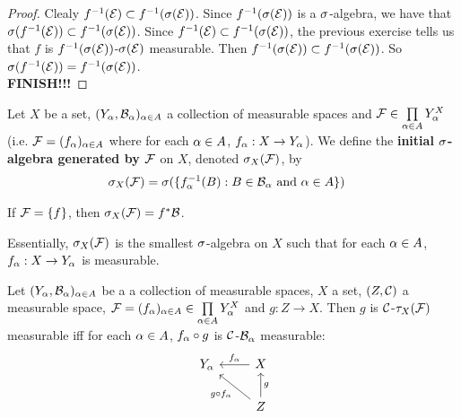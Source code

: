 \documentclass{book}
\begin{document}
	\begin{proof}
		Clealy $f^{-1}(\mathcal{E}) \subset f^{-1}(\sigma(\mathcal{E}))$. Since $f^{-1}(\sigma(\mathcal{E}))$ is a $\sigma$-algebra, we have that $\sigma(f^{-1}(\mathcal{E})) \subset f^{-1}(\sigma(\mathcal{E}))$. Since $f^{-1}(\mathcal{E}) \subset f^{-1}(\sigma(\mathcal{E}))$, the previous exercise tells us that $f$ is $f^{-1}(\sigma(\mathcal{E}))$-$\sigma(\mathcal{E})$ measurable. Then $f^{-1}(\sigma(\mathcal{E})) \subset f^{-1}(\sigma(\mathcal{E}))$. So $\sigma(f^{-1}(\mathcal{E})) = f^{-1}(\sigma(\mathcal{E}))$.  \\
		\textbf{FINISH!!!}
	\end{proof}
	
	\begin{defn} 
		Let $X$ be a set, $(Y_{\alpha}, \mathcal{B}_{\alpha})_{\alpha \in A}$ a collection of measurable spaces and $\mathcal{F} \in \prod \limits_{\alpha \in A}Y_{\alpha}^X$ (i.e. $\mathcal{F} = (f_{\alpha})_{\alpha \in A}$ where for each $\alpha \in A$, $f_{\alpha}:X \rightarrow Y_{\alpha}$). We define the \textbf{initial $\sigma$-algebra generated by $\mathcal{F}$} on $X$, denoted $\sigma_X(\mathcal{F})$, by 
		\begin{align*}
			\sigma_X(\mathcal{F}) 
			&= \sigma(\{f_{\alpha}^{-1}(B): B \in \mathcal{B}_{\alpha} \text{ and } \alpha \in A \})
		\end{align*}	 
	\end{defn}
	
	\begin{note}
		If $\mathcal{F} = \{f\}$, then $\sigma_X(\mathcal{F}) = f^*\mathcal{B}$.
	\end{note}
	
	\begin{note}
		Essentially, $\sigma_X(\mathcal{F})$ is the smallest $\sigma$-algebra on $X$ such that for each $\alpha \in A$, $f_{\alpha}:X \rightarrow Y_{\alpha}$ is measurable. 
	\end{note}

	\begin{ex} 
		Let $(Y_{\alpha}, \mathcal{B}_{\alpha})_{\alpha \in A}$ be a a collection of measurable spaces, $X$ a set, $(Z, \mathcal{C})$ a measurable space, $\mathcal{F} = (f_{\alpha})_{\alpha \in A} \in \prod \limits_{\alpha \in A}Y_{\alpha}^X$ and $g: Z \rightarrow X$. Then $g$ is $\mathcal{C}$-$\tau_X(\mathcal{F})$ measurable iff for each $\alpha \in A$, $f_{\alpha} \circ g$ is $\mathcal{C}$-$\mathcal{B}_{\alpha}$ measurable:
		\[ \begin{tikzcd}
			Y_{\al}	
			& X  \arrow[l, "f_{\al}"'] \\
			& Z \arrow[ul, "g \circ f_{\al}"]  \arrow[u, "g"']
		\end{tikzcd}
		\]
	\end{ex}
	
\end{document}
